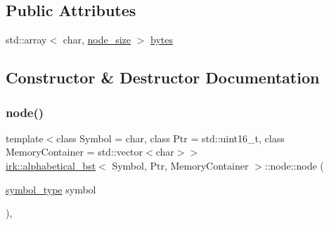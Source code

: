 \subsection*{Public Attributes}
\begin{DoxyCompactItemize}
\item 
std\+::array$<$ char, \mbox{\hyperlink{classirk_1_1alphabetical__bst_a6f7d3f7002730eb7840e449d4d371235}{node\+\_\+size}} $>$ \mbox{\hyperlink{structirk_1_1alphabetical__bst_1_1node_a0ecc1ed0ebca1446a4dc5b32a0e826a7}{bytes}}
\end{DoxyCompactItemize}


\subsection{Constructor \& Destructor Documentation}
\mbox{\label{structirk_1_1alphabetical__bst_1_1node_a5b892f196ffd2c8c732b7a230097dd42}} 
\subsubsection{\texorpdfstring{node()}{node()}\hspace{0.1cm}{\footnotesize\ttfamily [1/2]}}
{\footnotesize\ttfamily template$<$class Symbol = char, class Ptr = std\+::uint16\+\_\+t, class Memory\+Container = std\+::vector$<$char$>$$>$ \\
\mbox{\hyperlink{classirk_1_1alphabetical__bst}{irk\+::alphabetical\+\_\+bst}}$<$ Symbol, Ptr, Memory\+Container $>$\+::node\+::node (\begin{DoxyParamCaption}\item[{\mbox{\hyperlink{classirk_1_1alphabetical__bst_a296ccb8fa9fa9dce3b3c3beab0a5ca28}{symbol\+\_\+type}}}]{symbol }\end{DoxyParamCaption})\hspace{0.3cm}{\ttfamily [inline]}, {\ttfamily [explicit]}}

\mbox{\label{structirk_1_1alphabetical__bst_1_1node_add6fee4d8429568f4caa72a221279470}} 
